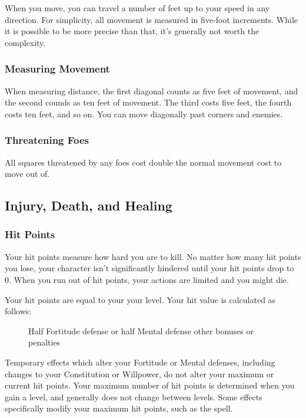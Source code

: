 When you move, you can travel a number of feet up to your speed in any direction.
For simplicity, all movement is measured in five-foot increments.
While it is possible to be more precise than that, it's generally not worth the complexity.

\subsubsection{Measuring Movement}

 When measuring distance, the first diagonal counts as five feet of movement, and the second counds as ten feet of movement.
The third costs five feet, the fourth costs ten feet, and so on.
You can move diagonally past corners and enemies.

\subsubsection{Threatening Foes}
All squares threatened by any foes cost double the normal movement cost to move out of.

\subsection{Injury, Death, and Healing}\label{Injury, Death, and Healing}

\subsubsection{Hit Points}\label{Hit Points}
Your hit points measure how hard you are to kill.
No matter how many hit points you lose, your character isn't significantly hindered until your hit points drop to 0.
When you run out of hit points, your actions are limited and you might die.

Your hit points are equal to your  \mtimes your level.
Your hit value is calculated as follows:

\begin{figure}[h]
    \centering Half Fortitude defense or half Mental defense \add other bonuses or penalties
\end{figure}

 Temporary effects which alter your Fortitude or Mental defenses, including changes to your Constitution or Willpower, do not alter your maximum or current hit points.
Your maximum number of hit points is determined when you gain a level, and generally does not change between levels.
Some effects specifically modify your maximum hit points, such as the  spell.

